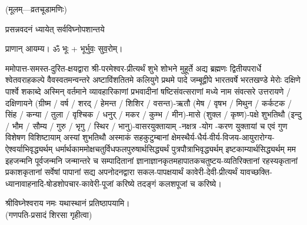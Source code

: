 
\centerline{\small{(मूलम्—व्रतचूडामणिः)}}




{प्रसन्नवदनं ध्यायेत् सर्वविघ्नोपशान्तये}

प्राणान् आयम्य। ॐ भूः + भूर्भुवः॒ सुव॒रोम्।


ममोपात्त-समस्त-दुरित-क्षयद्वारा श्री-परमेश्वर-प्रीत्यर्थं शुभे शोभने मुहूर्ते अद्य ब्रह्मणः
द्वितीयपरार्धे श्वेतवराहकल्पे वैवस्वतमन्वन्तरे अष्टाविंशतितमे कलियुगे प्रथमे पादे
जम्बूद्वीपे भारतवर्षे भरतखण्डे मेरोः दक्षिणे पार्श्वे शकाब्दे अस्मिन् वर्तमाने व्यावहारिकाणां
प्रभवादीनां षष्टिसंवत्सराणां मध्ये \blank{} नाम संवत्सरे उत्तरायणे / दक्षिणायने
(ग्रीष्म / वर्ष / शरद् / हेमन्त / शिशिर / वसन्त)-ऋतौ (मेष / वृषभ / मिथुन / कर्कटक / सिंह / कन्या / तुला /
वृश्चिक / धनुर् / मकर / कुम्भ / मीन)-मासे (शुक्ल / कृष्ण)-पक्षे \blank{} शुभतिथौ
(इन्दु / भौम / सौम्य / गुरु / भृगु / स्थिर / भानु)-वासरयुक्तायाम्
\blank{}-नक्षत्र \blank{}-योग \blank-करण युक्तायां च एवं गुण विशेषण विशिष्टायाम्
अस्यां \blank{} शुभतिथौ
अस्माकं सहकुटुम्बानां क्षेमस्थैर्य-धैर्य-वीर्य-विजय-आयुरारोग्य-ऐश्वर्याभिवृद्ध्यर्थम्
धर्मार्थकाममोक्ष\-चतुर्विधफलपुरुषार्थसिद्ध्यर्थं पुत्रपौत्राभि\-वृद्ध्यर्थम् इष्टकाम्यार्थसिद्ध्यर्थम्
मम इहजन्मनि पूर्वजन्मनि जन्मान्तरे च सम्पादितानां ज्ञानाज्ञानकृतमहा\-पातकचतुष्टय-व्यतिरिक्तानां रहस्यकृतानां प्रकाशकृतानां सर्वेषां पापानां सद्य अपनोदनद्वारा सकल-पापक्षयार्थं
कावेरी-देवी-प्रीत्यर्थं यावच्छक्ति-ध्यानावाहनादि-षोडशोपचार-कावेरी-पूजां करिष्ये तदङ्गं कलशपूजां च करिष्ये।

श्रीविघ्नेश्वराय नमः यथास्थानं प्रतिष्ठापयामि।\\
(गणपति-प्रसादं शिरसा गृहीत्वा)













\renewcommand{\devAya}{कावेरी-देव्यै नमः,}

